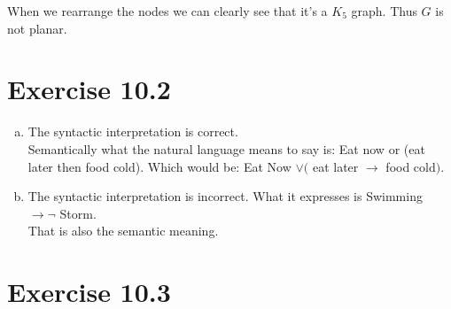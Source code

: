\documentclass{article} %
\newcommand{\homeworkNumber}{10}
\begin{document}
When we rearrange the nodes we can clearly see that it's a \( K_{5} \) graph. Thus \( G \) is not planar.\\
\section*{Exercise \homeworkNumber.2}

\begin{enumerate}[(a)]
	\item
	The syntactic interpretation is correct. \\
	Semantically what the natural language means to say is: Eat now or (eat later then food cold).
	Which would be: Eat Now $\lor($ eat later $\rightarrow$ food cold$)$.
	\item
	The syntactic interpretation is incorrect. What it expresses is Swimming $\rightarrow \neg$ Storm. \\
	That is also the semantic meaning.

\end{enumerate}



\section*{Exercise \homeworkNumber.3}
\end{document}
